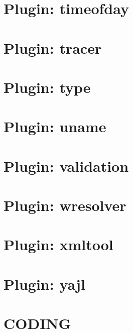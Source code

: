 \documentclass[twoside]{book}
\newcommand{\+}{\discretionary{\mbox{\scriptsize$\hookleftarrow$}}{}{}}
\begin{document}
\chapter{Plugin\+: timeofday}
\label{md_src_plugins_timeofday_README}
\hypertarget{md_src_plugins_timeofday_README}{}

\chapter{Plugin\+: tracer}
\label{md_src_plugins_tracer_README}
\hypertarget{md_src_plugins_tracer_README}{}

\chapter{Plugin\+: type}
\label{md_src_plugins_type_README}
\hypertarget{md_src_plugins_type_README}{}

\chapter{Plugin\+: uname}
\label{md_src_plugins_uname_README}
\hypertarget{md_src_plugins_uname_README}{}

\chapter{Plugin\+: validation}
\label{md_src_plugins_validation_README}
\hypertarget{md_src_plugins_validation_README}{}

\chapter{Plugin\+: wresolver}
\label{md_src_plugins_wresolver_README}
\hypertarget{md_src_plugins_wresolver_README}{}

\chapter{Plugin\+: xmltool}
\label{md_src_plugins_xmltool_README}
\hypertarget{md_src_plugins_xmltool_README}{}

\chapter{Plugin\+: yajl}
\label{md_src_plugins_yajl_README}
\hypertarget{md_src_plugins_yajl_README}{}

\chapter{C\+O\+D\+I\+N\+G}
\label{doc_CODING_md}
\hypertarget{doc_CODING_md}{}

\end{document}

